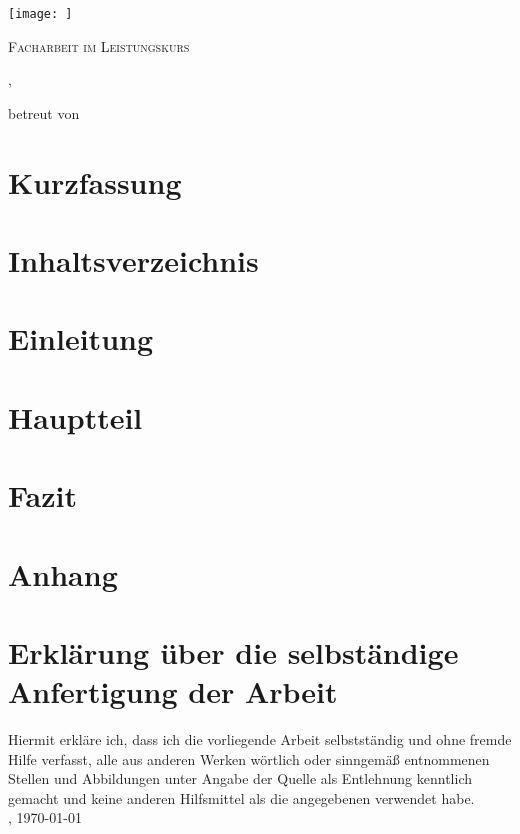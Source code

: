\documentclass[a4paper,12pt,arial]{scrartcl}
\newcommand{\Name}{}
\newcommand{\Strasse}{}
\newcommand{\Ort}{}
\newcommand{\PLZ}{}
\newcommand{\Schule}{}
\newcommand{\Leistungskurs}{}
\newcommand{\Betreuer}{}
\newcommand{\Thema}{}
\begin{document}
\begin{titlepage}
	\centering
	\texttt{[image: ]}\par\vspace{1cm}
	{\scshape\LARGE \Schule \par}
	\vspace{1cm}
	{\scshape\Large Facharbeit im Leistungskurs \Leistungskurs\par}
	\vspace{1.5cm}
	{\huge\bfseries \Thema\par}
	\vspace{2cm}
	{\Large\itshape \Name\par}
	\small{\Strasse, \PLZ \space \Ort}
	\vfill
\par
	betreut von\par
	\Betreuer

\end{titlepage}

\section{Kurzfassung}

\section{Inhaltsverzeichnis}

\section{Einleitung}
\section{Hauptteil}
\section{Fazit}
\section{Anhang}
\section{Erklärung über die selbständige Anfertigung der Arbeit}
Hiermit erkläre ich, dass ich die vorliegende Arbeit selbstständig und ohne fremde Hilfe verfasst, alle aus anderen Werken wörtlich oder sinngemäß entnommenen Stellen und Abbildungen unter Angabe der Quelle als Entlehnung kenntlich gemacht und keine anderen Hilfsmittel als die angegebenen verwendet habe. \\
\Ort, \today \space \Name
\end{document}
